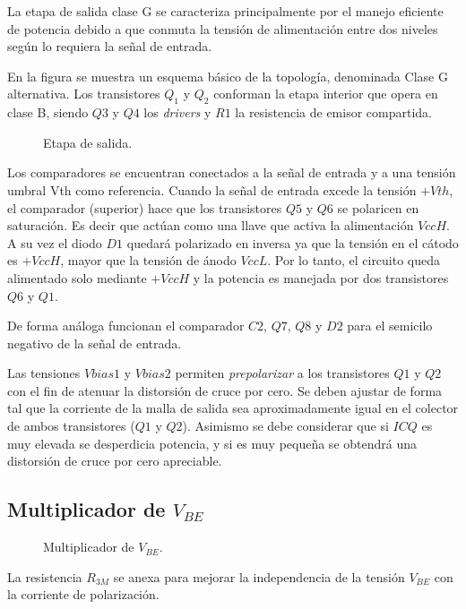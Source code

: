 	La etapa de salida clase G se caracteriza principalmente por el manejo eficiente de potencia debido a que conmuta la tensión de alimentación entre dos niveles según lo requiera la señal de entrada.

	En la figura se muestra un esquema básico de la topología, denominada Clase G alternativa.  Los transistores $Q_1$ y $Q_2$ conforman la etapa interior que opera en clase B, siendo $Q3$ y $Q4$ los \textit{drivers} y $R1$ la resistencia de emisor compartida. 

	\begin{figure}[H]
		\centering
		\scalebox{0.5}{}
		\caption{Etapa de salida.}
		\label{fig.salida}
	\end{figure}

	Los comparadores se encuentran conectados a la señal de entrada y a una tensión umbral Vth como referencia. Cuando la señal de entrada excede la tensión $+Vth$, el comparador (superior) hace que los transistores $Q5$ y $Q6$ se polaricen en saturación. Es decir que actúan como una llave que activa la alimentación $VccH$. A su vez el diodo $D1$ quedará polarizado en inversa ya que la tensión en el cátodo es $+VccH$, mayor que la tensión de ánodo $VccL$. Por lo tanto, el circuito queda alimentado solo mediante $+VccH$ y la potencia es manejada por dos transistores $Q6$ y $Q1$.

	De forma análoga funcionan el comparador $C2$, $Q7$, $Q8$ y $D2$ para el semicilo negativo de la señal de entrada.

	Las tensiones $Vbias1$ y $Vbias2$ permiten \textit{prepolarizar} a los transistores $Q1$ y $Q2$ con el fin de atenuar la distorsión de cruce por cero. Se deben ajustar de forma tal que la corriente de la malla de salida sea aproximadamente igual en el colector de ambos transistores ($Q1$ y $Q2$). Asimismo se debe considerar que si $ICQ$ es muy elevada se desperdicia potencia, y si es muy pequeña se obtendrá una distorsión de cruce por cero apreciable. 


\subsection{Multiplicador de $V_{BE}$}

	\begin{figure}[H]
		\centering
		\scalebox{0.5}{}
		\caption{Multiplicador de $V_{BE}$.}
		\label{fig.multiplicador}
	\end{figure}

	La resistencia $R_{3M}$ se anexa para mejorar la independencia de la tensión $V_{BE}$ con la corriente de polarización.

